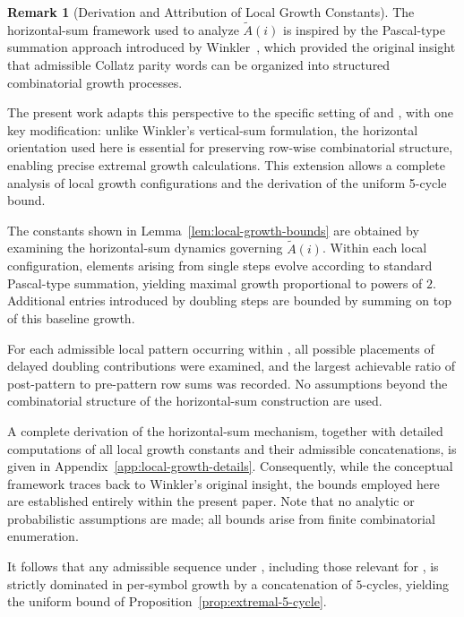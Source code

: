 \documentclass[12pt, oneside]{article}   	%
\numberwithin{equation}{section}          %
\theoremstyle{definition}
\newtheorem*{remark}{Remark}
\begin{document}
\begin{remark}[Derivation and Attribution of Local Growth Constants]
The horizontal-sum framework used to analyze $\widetilde A(i)$ is inspired by
the Pascal-type summation approach introduced by Winkler~\cite{Winkler2017},
which provided the original insight that admissible Collatz parity words can
be organized into structured combinatorial growth processes.  

The present work adapts this perspective to the specific setting of
 and , with one key modification: unlike
Winkler's vertical-sum formulation, the horizontal orientation used here is
essential for preserving row-wise combinatorial structure, enabling precise
extremal growth calculations. This extension allows a complete analysis of
local growth configurations and the derivation of the uniform 5-cycle bound.

The constants shown in Lemma~\ref{lem:local-growth-bounds} are obtained by
examining the horizontal-sum dynamics governing $\widetilde A(i)$.
Within each local configuration, elements arising from single steps evolve
according to standard Pascal-type summation, yielding maximal growth
proportional to powers of $2$. Additional entries introduced by doubling steps
are bounded by summing on top of this baseline growth.

For each admissible local pattern occurring within , all possible
placements of delayed doubling contributions were examined, and the largest
achievable ratio of post-pattern to pre-pattern row sums was recorded. No
assumptions beyond the combinatorial structure of the horizontal-sum
construction are used.

A complete derivation of the horizontal-sum mechanism, together with detailed
computations of all local growth constants and their admissible concatenations,
is given in Appendix~\ref{app:local-growth-details}. Consequently, while the
conceptual framework traces back to Winkler’s original insight, the bounds
employed here are established entirely within the present paper.  Note that no
analytic or probabilistic assumptions are made; all bounds arise from finite
combinatorial enumeration.

It follows that any admissible sequence under , including those
relevant for , is strictly dominated in per-symbol growth by a
concatenation of $5$-cycles, yielding the uniform bound of
Proposition~\ref{prop:extremal-5-cycle}.
\end{remark}
\end{document}
